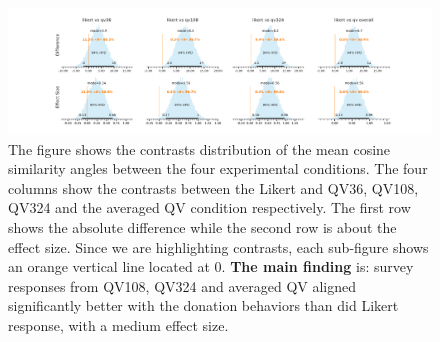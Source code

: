 \begin{figure}[htpb]
  \centering
  \includegraphics[trim= 2in 0in 2in 0in, clip, width=\textwidth, keepaspectratio=true]{"content/image/Votes_vs_Absolute_Donation_StudentT_differences_and_effects.pdf"}
  \caption{
    The figure shows the contrasts distribution of the mean cosine similarity angles between the four experimental conditions. The four columns show the contrasts between the Likert and QV36, QV108, QV324 and the averaged QV condition respectively. The first row shows the absolute difference while the second row is about the effect size. Since we are highlighting contrasts, each sub-figure shows an orange vertical line located at 0. \textbf{The main finding} is: survey responses from QV108, QV324 and averaged QV aligned significantly better with the donation behaviors than did Likert response, with a medium effect size.
  }
  \label{fig:contrast_exp1}
\end{figure}

